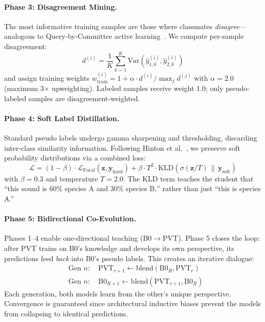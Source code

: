 \documentclass[a4paper]{article}
\newcommand{\kld}{\text{KLD}}
\begin{document}
\paragraph{Phase 3: Disagreement Mining.}
The most informative training samples are those where classmates \emph{disagree}---analogous to Query-by-Committee active learning~\citep{seung1992query}.
We compute per-sample disagreement:
\begin{equation}
d^{(i)} = \frac{1}{K} \sum_{k=1}^{K} \text{Var}\left(\hat{y}_{1,k}^{(i)}, \hat{y}_{2,k}^{(i)}\right)
\end{equation}
and assign training weights $w_\text{train}^{(i)} = 1 + \alpha \cdot d^{(i)} / \max_j d^{(j)}$ with $\alpha=2.0$ (maximum 3$\times$ upweighting).
Labeled samples receive weight 1.0; only pseudo-labeled samples are disagreement-weighted.

\paragraph{Phase 4: Soft Label Distillation.}
Standard pseudo labels undergo gamma sharpening and thresholding, discarding inter-class similarity information.
Following Hinton et al.~\citep{hinton2015distilling}, we preserve soft probability distributions via a combined loss:
\begin{equation}
\mathcal{L} = (1-\beta) \cdot \mathcal{L}_\text{Focal}(\mathbf{z}, \mathbf{y}_\text{hard})
+ \beta \cdot T^2 \cdot \kld\left(\sigma(\mathbf{z}/T) \,\|\, \mathbf{y}_\text{soft}\right)
\end{equation}
with $\beta=0.3$ and temperature $T=2.0$. The KLD term teaches the student that ``this sound is 60\% species A and 30\% species B,'' rather than just ``this is species A.''

\paragraph{Phase 5: Bidirectional Co-Evolution.}
Phases 1--4 enable one-directional teaching (B0$\to$PVT).
Phase 5 closes the loop: after PVT trains on B0's knowledge and develops its own perspective, its predictions feed \emph{back} into B0's pseudo labels.
This creates an iterative dialogue:
\begin{align}
&\text{Gen } n: \quad \text{PVT}_{r+1} \leftarrow \text{blend}(\text{B0}_R, \text{PVT}_r) \\
&\text{Gen } n: \quad \text{B0}_{R+1} \leftarrow \text{blend}(\text{PVT}_{r+1}, \text{B0}_R)
\end{align}
Each generation, both models learn from the other's unique perspective.
Convergence is guaranteed since architectural inductive biases prevent the models from collapsing to identical predictions.
\end{document}

